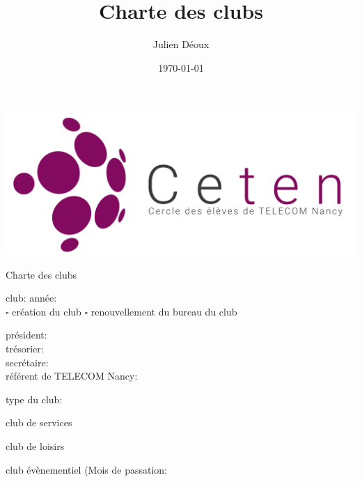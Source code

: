 \documentclass{article} %
\title{Charte des clubs}
\author{Julien Déoux}
\date\today
\begin{document}
	
	\begin{titlepage}
		\begin{center}
			\includegraphics[width=\textwidth]{images/ceten.png}\par
			\vspace{0.5cm}
			{\Huge \light{} Charte des clubs}\par
			\vspace{1cm}
		\end{center}
		\begin{center}
			club: \underline{\hspace{8cm}}
			année: \underline{\hspace{1.5cm}}\\
			\vspace{\baselineskip}
			$\square$ création du club
			\hspace{3cm}
			$\square$ renouvellement du bureau du club\\
			\vspace{\baselineskip}
			\begin{spacing}{1.5}
				président: \underline{\hspace{7cm}}\\
				trésorier: \underline{\hspace{7cm}}\\
				secrétaire: \underline{\hspace{7cm}}\\
				référent de TELECOM Nancy: \underline{\hspace{7cm}}\\
			\end{spacing}
		\end{center}
		type du club:
		\begin{todolist}
		\item club de services
		\item club de loisirs
		\item club évènementiel (Mois de passation:

\end{todolist}
\end{titlepage}
\end{document}
